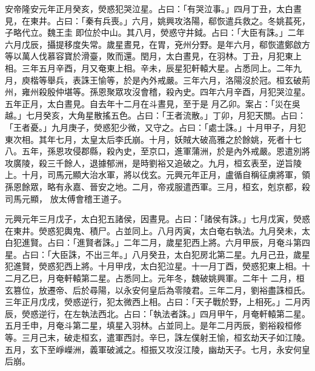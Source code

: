 \begin{pinyinscope}
 安帝隆安元年正月癸亥，熒惑犯哭泣星。占曰：「有哭泣事。」四月丁丑，太白晝見，在東井。占曰：「秦有兵喪。」六月，姚興攻洛陽，郗恢遣兵救之。冬姚萇死，子略代立。魏王圭
 即位於中山。其八月，熒惑守井鉞。占曰：「大臣有誅。」二年六月戊辰，攝提移度失常。歲星晝見，在胃，兗州分野。是年六月，郗恢遣鄭啟方等以萬人伐慕容寶於滑臺，敗而還。閏月，太白晝見，在羽林。丁丑，月犯東上相。三年五月辛酉，月又奄東上相。辛未，辰星犯軒轅大星。占悉同上。二年九月，庾楷等舉兵，表誅王愉等，於是內外戒嚴。三年六月，洛陽沒於冠。桓玄破荊州，雍州殺殷仲堪等。孫恩聚眾攻沒會稽，殺內史。四年六月辛酉，月犯哭泣星。五年正月，太白晝見。自去年十二月在斗晝見，至于是
 月乙卯。案占：「災在吳越。」七月癸亥，大角星散搖五色。占曰：「王者流散。」丁卯，月犯天關。占曰：「王者憂。」九月庚子，熒惑犯少微，又守之。占曰：「處士誅。」十月甲子，月犯東次相。其年七月，太皇太后李氏崩。十月，妖賊大破高雅之於餘姚，死者十七八。五年，孫恩攻侵郡縣，殺內史，至京口，進軍蒲洲，於是內外戒嚴。恩遣別將攻廣陵，殺三千餘人，退據郁洲，是時劉裕又追破之。九月，桓玄表至，逆旨陵上。十月，司馬元顯大治水軍，將以伐玄。元興元年正月，盧循自稱征虜將軍，領孫恩餘眾，略有永嘉、晉安之地。二月，帝戎服遣西軍。三月，桓玄，剋京都，殺司馬元顯，
 放太傅會稽王道子。



 元興元年三月戊子，太白犯五諸侯，因晝見。占曰：「諸侯有誅。」七月戊寅，熒惑在東井。熒惑犯輿鬼、積尸。占並同上。八月丙寅，太白奄右執法。九月癸未，太白犯進賢。占曰：「進賢者誅。」二年二月，歲星犯西上將。六月甲辰，月奄斗第四星。占曰：「大臣誅，不出三年。」八月癸丑，太白犯房北第二星。九月己丑，歲星犯進賢，熒惑犯西上將。十月甲戌，太白犯泣星。十一月丁酉，熒惑犯東上相。十二月乙巳，月奄軒轅第二星。占悉同上。元年冬，魏破姚興軍。二年十
 二月，桓玄篡位，放遷帝、后於尋陽，以永安何皇后為零陵君。三年二月，劉裕盡誅桓氏。三年正月戊戌，熒惑逆行，犯太微西上相。占曰：「天子戰於野，上相死。」二月丙辰，熒惑逆行，在左執法西北。占曰：「執法者誅。」四月甲午，月奄軒轅第二星。五月壬申，月奄斗第二星，填星入羽林。占並同上。是年二月丙辰，劉裕殺桓修等。三月己末，破走桓玄，遣軍西討。辛巳，誅左僕射王愉，桓玄劫天子如江陵。五月，玄下至崢嶸洲，義軍破滅之。桓振又攻沒江陵，幽劫天子。七月，永安何皇后崩。




\end{pinyinscope}
